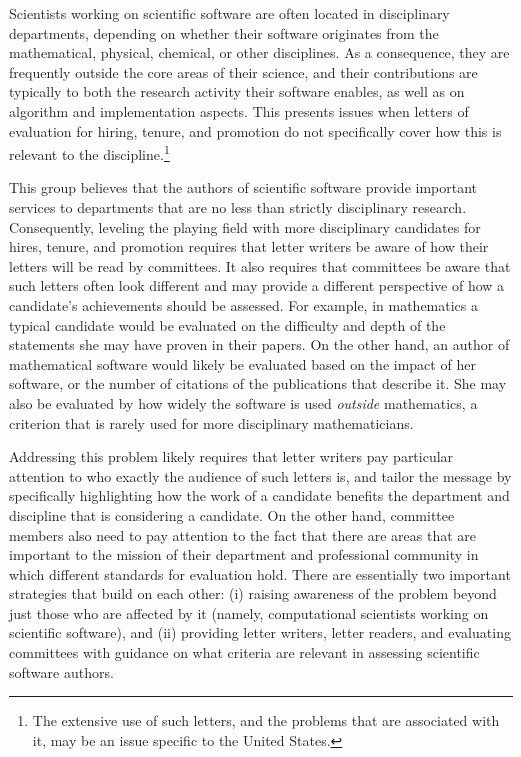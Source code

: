 \documentclass[11pt, oneside]{amsart}
\begin{document}
Scientists working on scientific software are often located in
disciplinary departments, depending on whether their software
originates from the mathematical, physical, chemical, or other
disciplines. As a consequence, they are frequently outside the core
areas of their science, and their contributions are typically to both
the research activity their software enables, as well as on
algorithm and implementation aspects. This presents issues when
letters of evaluation for hiring, tenure, and promotion do not specifically
cover how this is relevant to the discipline.\footnote{The extensive use of such letters, and the problems that are
  associated with it, may be an issue specific to the United States.}

This group believes that the authors of scientific software provide important
services to departments that are no less than strictly disciplinary
research. Consequently, leveling the playing field with more
disciplinary candidates for hires, tenure, and promotion requires that
letter writers be aware of how their letters will be read by
committees. It also requires that committees be aware that such
letters often look different and may provide a different perspective
of how a candidate's achievements should be assessed. For example, in
mathematics a typical candidate would be evaluated on the difficulty
and depth of the statements she may have proven in their papers. On
the other hand, an author of mathematical software would likely be
evaluated based on the impact of her software, or the number of citations of
the publications that describe it. She may also be evaluated by how
widely the software is used \textit{outside} mathematics, a criterion
that is rarely used for more disciplinary mathematicians.

Addressing this problem likely requires that letter writers pay
particular attention to who exactly the audience of such letters is,
and tailor the message by specifically highlighting how the work of a
candidate benefits the department and discipline that is considering a
candidate. On the other hand, committee members also need to pay
attention to the fact that there are areas that are important to the mission of
their department and professional community in which different
standards for evaluation hold.
%
There are essentially two important strategies that build on each
other: (i) raising awareness of the problem beyond just those who are
affected by it (namely, computational scientists working on scientific
software), and (ii) providing letter writers, letter readers, and
evaluating committees with guidance on what criteria are relevant in
assessing scientific software authors.
\end{document}
